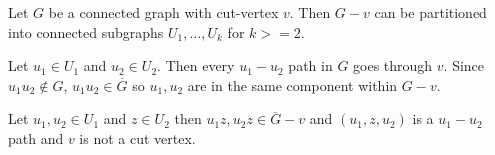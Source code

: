 Let $G$ be a connected graph with cut-vertex $v$. Then $G-v$ can be partitioned into connected
subgraphs $U_1, \ldots , U_k$ for $k >= 2$.

Let $u_1 \in U_1$ and $u_2 \in U_2$. Then every $u_1 - u_2$ path in $G$ goes through $v$. Since
$u_1u_2 \notin G$, $u_1u_2 \in \overline{G}$ so $u_1, u_2$ are in the same component within $G-v$.

Let $u_1, u_2 \in U_1$ and $z \in U_2$ then $u_1z, u_2z \in \overline{G}-v$ and $(u_1, z, u_2)$ is
a $u_1 - u_2$ path and $v$ is not a cut vertex.

